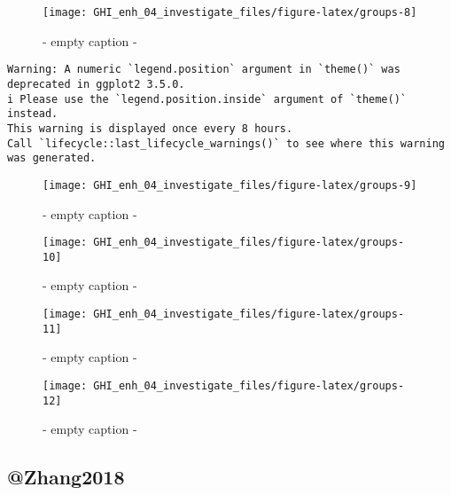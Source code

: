 \documentclass[
  10pt,
  a4paper,oneside]{article}
\begin{document}
\begin{figure}[H]

{\centering \texttt{[image: GHI\_enh\_04\_investigate\_files/figure-latex/groups-8]} 

}

\caption{ - empty caption - }\label{fig:groups-8}
\end{figure}

\begin{verbatim}
Warning: A numeric `legend.position` argument in `theme()` was deprecated in ggplot2 3.5.0.
i Please use the `legend.position.inside` argument of `theme()` instead.
This warning is displayed once every 8 hours.
Call `lifecycle::last_lifecycle_warnings()` to see where this warning was generated.
\end{verbatim}

\begin{figure}[H]

{\centering \texttt{[image: GHI\_enh\_04\_investigate\_files/figure-latex/groups-9]} 

}

\caption{ - empty caption - }\label{fig:groups-9}
\end{figure}
\begin{figure}[H]

{\centering \texttt{[image: GHI\_enh\_04\_investigate\_files/figure-latex/groups-10]} 

}

\caption{ - empty caption - }\label{fig:groups-10}
\end{figure}
\begin{figure}[H]

{\centering \texttt{[image: GHI\_enh\_04\_investigate\_files/figure-latex/groups-11]} 

}

\caption{ - empty caption - }\label{fig:groups-11}
\end{figure}
\begin{figure}[H]

{\centering \texttt{[image: GHI\_enh\_04\_investigate\_files/figure-latex/groups-12]} 

}

\caption{ - empty caption - }\label{fig:groups-12}
\end{figure}

\hypertarget{zhang2018}{%
\subsection{@Zhang2018}\label{zhang2018}}
\end{document}
